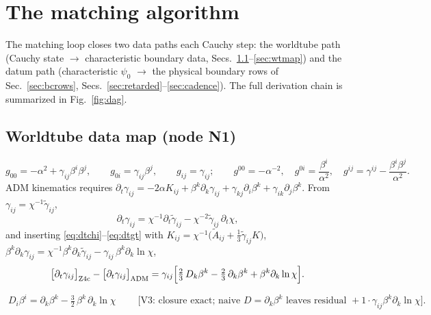 \section{The matching algorithm}
\label{sec:matching}

The matching loop closes two data paths each Cauchy step: the worldtube
path (Cauchy state $\to$ characteristic boundary data,
Secs.~\ref{sec:n1}--\ref{sec:wtmap}) and the datum path (characteristic
$\psi_0$ $\to$ the physical boundary rows of Sec.~\ref{sec:bcrows},
Secs.~\ref{sec:retarded}--\ref{sec:cadence}). The full derivation chain
is summarized in Fig.~\ref{fig:dag}.

\subsection{Worldtube data map (node N1)}
\label{sec:n1}

\begin{equation}
g_{00} = -\alpha^2 + \gamma_{ij}\beta^i\beta^j,\qquad
g_{0i} = \gamma_{ij}\beta^j,\qquad
g_{ij} = \gamma_{ij};
\qquad
g^{00} = -\alpha^{-2},\quad
g^{0i} = \frac{\beta^i}{\alpha^{2}},\quad
g^{ij} = \gamma^{ij} - \frac{\beta^i\beta^j}{\alpha^{2}}.
\label{eq:fourmetric}
\end{equation}
ADM kinematics requires
$\partial_t\gamma_{ij} = -2\alpha K_{ij} + \beta^k\partial_k\gamma_{ij}
 + \gamma_{kj}\partial_i\beta^k + \gamma_{ik}\partial_j\beta^k$.
From $\gamma_{ij} = \chi^{-1}\tilde\gamma_{ij}$,
\begin{equation}
\partial_t\gamma_{ij}
 = \chi^{-1}\partial_t\tilde\gamma_{ij}
 - \chi^{-2}\tilde\gamma_{ij}\,\partial_t\chi ,
\label{eq:dtg-step1}
\end{equation}
and inserting \eqref{eq:dtchi}--\eqref{eq:dtgt} with
$K_{ij} = \chi^{-1}\big(\tilde A_{ij}+\tfrac13\tilde\gamma_{ij}K\big)$,
$\beta^k\partial_k\gamma_{ij} = \chi^{-1}\beta^k\partial_k\tilde\gamma_{ij}
 - \gamma_{ij}\,\beta^k\partial_k\ln\chi$,
\begin{equation}
\big[\partial_t\gamma_{ij}\big]_{\rm Z4c}
 - \big[\partial_t\gamma_{ij}\big]_{\rm ADM}
 = \gamma_{ij}\Big[\tfrac{2}{3}\,D_k\beta^k
 - \tfrac{2}{3}\,\partial_k\beta^k
 + \beta^k\partial_k\ln\chi\Big].
\label{eq:dtg-step2}
\end{equation}
\begin{nfblock}
\begin{equation}
\boxed{\;D_i\beta^i = \partial_k\beta^k
 - \tfrac{3}{2}\,\beta^k\,\partial_k\ln\chi\;}
\qquad\text{[V3: closure exact; naive }D=\partial_k\beta^k\text{ leaves
residual }+1\cdot\gamma_{ij}\beta^k\partial_k\ln\chi\text{]}.
\label{eq:divbeta}
\end{equation}
\end{nfblock}

